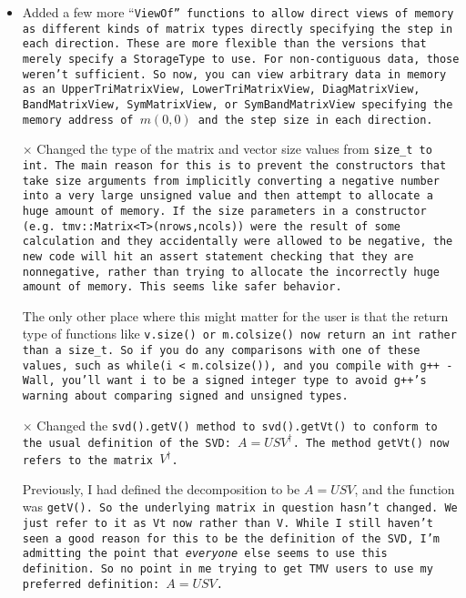 \begin{itemize}
\item 
Added a few more ``\tt{ViewOf}'' functions to allow direct views of memory as different kinds of matrix types directly specifying the step in each direction.  These are more flexible than the versions that merely specify a \tt{StorageType} to use.  For non-contiguous data, those weren't sufficient.  So now, you can view arbitrary data in memory as an \tt{UpperTriMatrixView}, \tt{LowerTriMatrixView},
\tt{DiagMatrixView}, \tt{BandMatrixView}, \tt{SymMatrixView}, or \tt{SymBandMatrixView} specifying the memory address of $m(0,0)$ and the step size in each direction.

\item[$\times$]
Changed the type of the matrix and vector size values from \tt{size\_t} to \tt{int}.  The main reason for this is to prevent the constructors that take size arguments from implicitly converting a negative number into a very large unsigned value and then attempt to allocate a huge amount of memory.  If the size parameters in a constructor (e.g. \tt{tmv::Matrix<T>(nrows,ncols)}) were the result of some calculation and they accidentally were allowed to be negative, the new code will hit an assert statement checking that they are nonnegative, rather than trying to allocate the incorrectly huge amount of memory.  This seems like safer behavior.

The only other place where this might matter for the user is that the return type of functions like \tt{v.size()} or \tt{m.colsize()} now return an \tt{int} rather than a \tt{size\_t}.  
So if you do any comparisons with one of these values, such as \tt{while(i < m.colsize())}, and you compile with \tt{g++ -Wall}, you'll want i to be a signed integer type to avoid \tt{g++}'s warning about comparing signed and unsigned types.

\item[$\times$]
Changed the \tt{svd().getV()} method to \tt{svd().getVt()} to conform to the
usual definition of the SVD: $A = U S V^\dagger$.  The method \tt{getVt()} now refers to the matrix $V^\dagger$.  

Previously, I had defined the decomposition to be $A = U S V$, and the function was \tt{getV()}.  So the underlying matrix in question hasn't changed.  We just refer to it as \tt{Vt} now rather than
\tt{V}.  While I still haven't seen a good reason for this to be the 
definition of the SVD, I'm admitting the point that {\em everyone} else
seems to use this definition.  So no point in me trying to get TMV users
to use my preferred definition: $A = U S V$.


\end{itemize}
